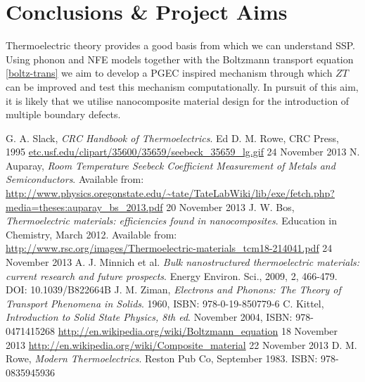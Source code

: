 \documentclass[a4paper,10pt,journal]{IEEEtran}
\begin{document}
\section{Conclusions \& Project Aims}
Thermoelectric theory provides a good basis from which we can
understand \ac{SSP}. Using phonon and \ac{NFE} models together with
the Boltzmann transport equation \eqref{boltz-trans} we aim to develop
a \ac{PGEC} inspired mechanism through which $ZT$ can be improved and
test this mechanism computationally. In pursuit of this aim, it is
likely that we utilise nanocomposite material design for the
introduction of multiple boundary defects.


\begin{thebibliography}{2}
G. A. Slack, \emph{CRC Handbook of Thermoelectrics}. Ed D. M. Rowe, CRC Press, 1995
\url{etc.usf.edu/clipart/35600/35659/seebeck_35659_lg.gif} 24 November
2013
N. Auparay, \emph{Room Temperature Seebeck Coefficient Measurement
of Metals and Semiconductors}. Available
from:
\url{http://www.physics.oregonstate.edu/~tate/TateLabWiki/lib/exe/fetch.php?media=theses:auparay_bs_2013.pdf} 20 November 2013
J. W. Bos, \emph{Thermoelectric materials: efficiencies found in
nanocomposites}. Education in Chemistry, March 2012. Available
from:
\url{http://www.rsc.org/images/Thermoelectric-materials_tcm18-214041.pdf} 24 November 2013
A. J. Minnich et al. \emph{Bulk nanostructured thermoelectric
materials: current research and future prospects}. Energy Environ.
Sci., 2009, 2, 466-479. DOI: 10.1039/B822664B
J. M. Ziman, \emph{Electrons and Phonons: The Theory of Transport
Phenomena in Solids}. 1960, ISBN: 978-0-19-850779-6
C. Kittel, \emph{Introduction to Solid State Physics, 8th ed}. November 2004, ISBN: 978-0471415268
\url{http://en.wikipedia.org/wiki/Boltzmann_equation} 18 November 2013
\url{http://en.wikipedia.org/wiki/Composite_material} 22 November 2013
D. M. Rowe, \emph{Modern Thermoelectrics}. Reston Pub Co, September
1983. ISBN: 978-0835945936
\end{thebibliography}
\end{document}
